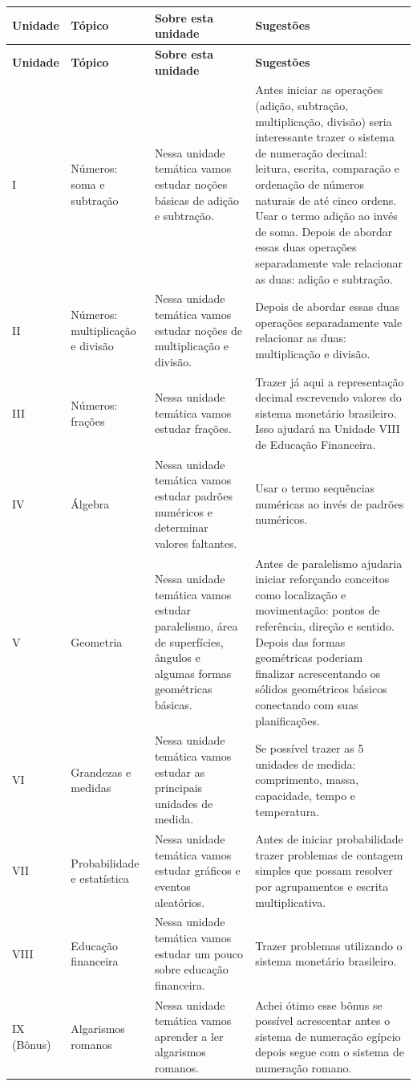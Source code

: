 \begin{longtable}{|m{1.5cm}|m{3.5cm}|m{4.5cm}|m{5cm}|}
\hline
\textbf{Unidade} & \textbf{Tópico} & \textbf{Sobre esta unidade} & \textbf{Sugestões} \\
\hline
\endfirsthead

\hline
\textbf{Unidade} & \textbf{Tópico} & \textbf{Sobre esta unidade} & \textbf{Sugestões} \\
\hline
\endhead

\hline
\endfoot

\hline
\endlastfoot

I & Números: soma e subtração & Nessa unidade temática vamos estudar noções básicas de adição e subtração. & 
Antes iniciar as operações (adição, subtração, multiplicação, divisão) seria interessante trazer o sistema de numeração decimal: leitura, escrita, comparação e ordenação de números naturais de até cinco ordens. Usar o termo adição ao invés de soma. Depois de abordar essas duas operações separadamente vale relacionar as duas: adição e subtração. \\
\hline
II & Números: multiplicação e divisão & Nessa unidade temática vamos estudar noções de multiplicação e divisão. & 
Depois de abordar essas duas operações separadamente vale relacionar as duas: multiplicação e divisão. \\
\hline
III & Números: frações & Nessa unidade temática vamos estudar frações. & 
Trazer já aqui a representação decimal escrevendo valores do sistema monetário brasileiro. Isso ajudará na Unidade VIII de Educação Financeira. \\
\hline
IV & Álgebra & Nessa unidade temática vamos estudar padrões numéricos e determinar valores faltantes. & 
Usar o termo sequências numéricas ao invés de padrões numéricos. \\
\hline
V & Geometria & Nessa unidade temática vamos estudar paralelismo, área de superfícies, ângulos e algumas formas geométricas básicas. & 
Antes de paralelismo ajudaria iniciar reforçando conceitos como localização e movimentação: pontos de referência, direção e sentido. Depois das formas geométricas poderiam finalizar acrescentando os sólidos geométricos básicos conectando com suas planificações. \\
\hline
VI & Grandezas e medidas & Nessa unidade temática vamos estudar as principais unidades de medida. & 
Se possível trazer as 5 unidades de medida: comprimento, massa, capacidade, tempo e temperatura. \\
\hline
VII & Probabilidade e estatística & Nessa unidade temática vamos estudar gráficos e eventos aleatórios. & 
Antes de iniciar probabilidade trazer problemas de contagem simples que possam resolver por agrupamentos e escrita multiplicativa. \\
\hline
VIII & Educação financeira & Nessa unidade temática vamos estudar um pouco sobre educação financeira. & 
Trazer problemas utilizando o sistema monetário brasileiro. \\
\hline
IX (Bônus) & Algarismos romanos & Nessa unidade temática vamos aprender a ler algarismos romanos. & 
Achei ótimo esse bônus se possível acrescentar antes o sistema de numeração egípcio depois segue com o sistema de numeração romano. \\


\end{longtable}
